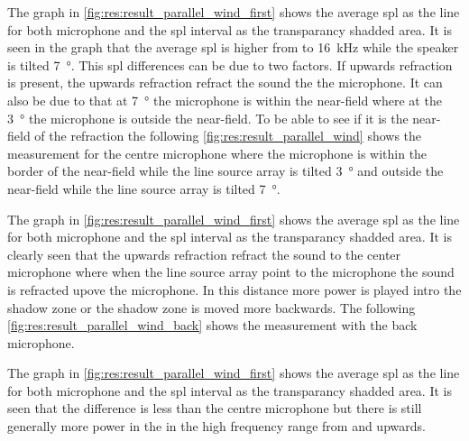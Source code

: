 The graph in \autoref{fig:res:result_parallel_wind_first} shows the average \gls{spl} as the line for both microphone and the \gls{spl} interval as the transparancy shadded area.
It is seen in the graph that the average \gls{spl} is higher from  to \SI{16}{\kilo\hertz} while the speaker is tilted \SI{7}{\degree}. This \gls{spl} differences can be due to two factors. If upwards refraction is present, the upwards refraction refract the sound the the microphone. It can also be due to that at \SI{7}{\degree} the microphone is within the near-field where at the \SI{3}{\degree} the microphone is outside the near-field. To be able to see if it is the near-field of the refraction the following \autoref{fig:res:result_parallel_wind} shows the measurement for the centre microphone where the microphone is within the border of the near-field while the line source array is tilted \SI{3}{\degree} and outside the near-field while the line source array is tilted \SI{7}{\degree}.
 
  
  
 The graph in \autoref{fig:res:result_parallel_wind_first} shows the average \gls{spl} as the line for both microphone and the \gls{spl} interval as the transparancy shadded area. It is clearly seen that the upwards refraction refract the sound to the center microphone where when the line source array point to the microphone the sound is refracted upove the microphone. In this distance more power is played intro the shadow zone or the shadow zone is moved more backwards. The following \autoref{fig:res:result_parallel_wind_back} shows the measurement with the back microphone.
 
 
  
   
The graph in \autoref{fig:res:result_parallel_wind_first} shows the average \gls{spl} as the line for both microphone and the \gls{spl} interval as the transparancy shadded area. It is seen that the difference is less than the centre microphone but there is still generally more power in the in the high frequency range from  and upwards.   
   
